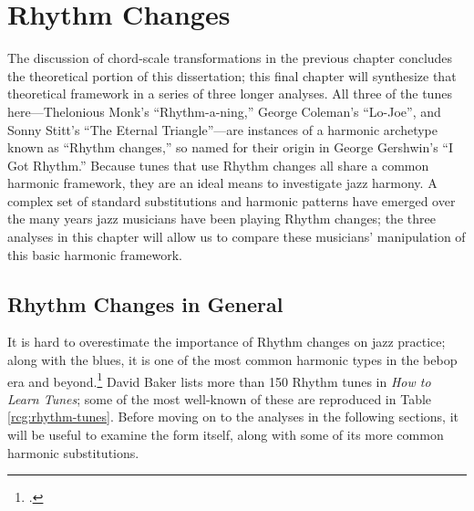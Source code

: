 
\chapter{Rhythm Changes}
\label{chap:rhythm-changes}
\addtocspace
{}

The discussion of chord-scale transformations in the previous chapter
concludes the theoretical portion of this dissertation; this final chapter
will synthesize that theoretical framework in a series of three longer
analyses. All three of the tunes here---Thelonious Monk's ``Rhythm-a-ning,''
George Coleman's ``Lo-Joe'', and Sonny Stitt's ``The Eternal Triangle''---are
instances of a harmonic archetype known as ``Rhythm changes,'' so named for
their origin in George Gershwin's ``I Got Rhythm.'' Because tunes
that use Rhythm changes all share a common harmonic framework, they are an ideal
means to investigate jazz harmony. A complex set of standard substitutions and
harmonic patterns have emerged over the many years jazz musicians have been
playing Rhythm changes; the three analyses in this chapter will allow us to
compare these musicians' manipulation of this basic harmonic framework.

\section{Rhythm Changes in General}
\label{sec:rhythm-changes-general}

It is hard to overestimate the importance of Rhythm changes on jazz practice;
along with the blues, it is one of the most common harmonic types in the bebop
era and beyond.\footcite[13]{owens:1995} David Baker lists more than 150
Rhythm tunes in \emph{How to Learn Tunes}; some of the most well-known
of these are reproduced in Table
\ref{rcg:rhythm-tunes}. Before moving on to the
analyses in the following sections, it will be useful to examine the
form itself, along with some of its more common harmonic substitutions.

